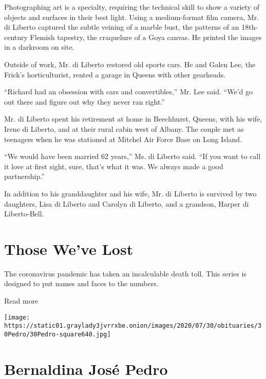 Photographing art is a specialty, requiring the technical skill to show
a variety of objects and surfaces in their best light. Using a
medium-format film camera, Mr. di Liberto captured the subtle veining of
a marble bust, the patterns of an 18th-century Flemish tapestry, the
craquelure of a Goya canvas. He printed the images in a darkroom on
site.

Outside of work, Mr. di Liberto restored old sports cars. He and Galen
Lee, the Frick's horticulturist, rented a garage in Queens with other
gearheads.

``Richard had an obsession with cars and convertibles,'' Mr. Lee said.
``We'd go out there and figure out why they never ran right.''

Mr. di Liberto spent his retirement at home in Beechhurst, Queens, with
his wife, Irene di Liberto, and at their rural cabin west of Albany. The
couple met as teenagers when he was stationed at Mitchel Air Force Base
on Long Island.

``We would have been married 62 years,'' Ms. di Liberto said. ``If you
want to call it love at first sight, sure, that's what it was. We always
made a good partnership.''

In addition to his granddaughter and his wife, Mr. di Liberto is
survived by two daughters, Lisa di Liberto and Carolyn di Liberto, and a
grandson, Harper di Liberto-Bell.

\href{https://www.nytimes3xbfgragh.onion/interactive/2020/obituaries/people-died-coronavirus-obituaries.html?action=click\&pgtype=Article\&state=default\&region=BELOW_MAIN_CONTENT\&context=covid_obits_promo}{}

\hypertarget{those-weve-lost}{%
\section{Those We've Lost}\label{those-weve-lost}}

The coronavirus pandemic has taken an incalculable death toll. This
series is designed to put names and faces to the numbers.

Read more

\texttt{[image: https://static01.graylady3jvrrxbe.onion/images/2020/07/30/obituaries/30Pedro/30Pedro-square640.jpg]}

\hypertarget{bernaldina-josuxe9-pedro}{%
\section{Bernaldina José Pedro}\label{bernaldina-josuxe9-pedro}}

